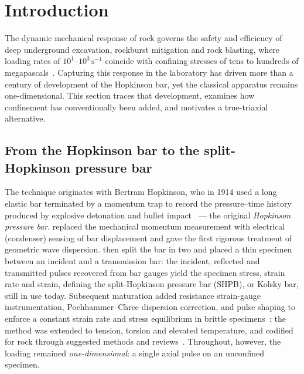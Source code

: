 \documentclass[sn-basic]{sn-jnl}
\begin{document}

\maketitle

\section{Introduction}\label{sec:intro}

The dynamic mechanical response of rock governs the safety and efficiency of
deep underground excavation, rockburst mitigation and rock blasting, where
loading rates of $10^{1}$--$10^{3}\,\mathrm{s}^{-1}$ coincide with confining
stresses of tens to hundreds of megapascals~\citep{zhang2014,WANG2026106436}. Capturing
this response in the laboratory has driven more than a century of development of
the Hopkinson bar, yet the classical apparatus remains one-dimensional. This
section traces that development, examines how confinement has conventionally been
added, and motivates a true-triaxial alternative.

\subsection{From the Hopkinson bar to the split-Hopkinson pressure bar}

The technique originates with Bertram Hopkinson, who in 1914 used a long elastic
bar terminated by a momentum trap to record the pressure--time history produced
by explosive detonation and bullet impact~\citep{hopkinson1914} --- the original
\emph{Hopkinson pressure bar}. \citet{davies1948} replaced the mechanical
momentum measurement with electrical (condenser) sensing of bar displacement and
gave the first rigorous treatment of geometric wave dispersion.
\citet{kolsky1949} then split the bar in two and placed a thin specimen between
an incident and a transmission bar: the incident, reflected and transmitted
pulses recovered from bar gauges yield the specimen stress, strain rate and
strain, defining the split-Hopkinson pressure bar (SHPB), or Kolsky bar, still in
use today. Subsequent maturation added resistance strain-gauge instrumentation,
Pochhammer--Chree dispersion correction, and pulse shaping to enforce a constant
strain rate and stress equilibrium in brittle specimens~\citep{frew2002}; the
method was extended to tension, torsion and elevated temperature, and codified
for rock through suggested methods and reviews~\citep{zhou2012,zhang2014,WANG2026106436}.
Throughout, however, the loading remained \emph{one-dimensional}: a single axial
pulse on an unconfined specimen.
\end{document}
